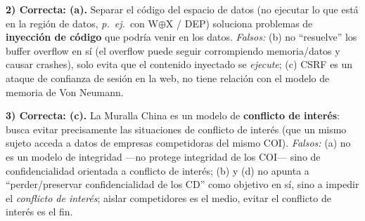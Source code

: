 \medskip
\textbf{2) Correcta: (a).} Separar el código del espacio de datos (no ejecutar lo que está en la
región de datos, \emph{p.\ ej.}\ con W$\oplus$X / DEP) soluciona problemas de \textbf{inyección
de código} que podría venir en los datos. \emph{Falsos:} (b) no ``resuelve'' los buffer overflow
en sí (el overflow puede seguir corrompiendo memoria/datos y causar crashes), solo evita que el
contenido inyectado se \emph{ejecute}; (c) CSRF es un ataque de confianza de sesión en la web,
no tiene relación con el modelo de memoria de Von Neumann.

\medskip
\textbf{3) Correcta: (c).} La Muralla China es un modelo de \textbf{conflicto de interés}: busca
evitar precisamente las situaciones de conflicto de interés (que un mismo sujeto acceda a datos
de empresas competidoras del mismo COI). \emph{Falsos:} (a) no es un modelo de integridad —no
protege integridad de los COI— sino de confidencialidad orientada a conflicto de interés; (b) y
(d) no apunta a ``perder/preservar confidencialidad de los CD'' como objetivo en sí, sino a
impedir el \emph{conflicto de interés}; aislar competidores es el medio, evitar el conflicto de
interés es el fin.
